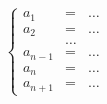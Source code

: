 \documentclass{article}
\begin{document}
\[
  \left\{
    \begin{array}{lcl}
      a_1&=&\ldots\\
      a_2&=&\ldots\\
      &\ldots\\
      a_{n-1}&=&\ldots\\
      a_n&=&\ldots\\
      a_{n+1}&=&\ldots 
    \end{array}
  \right.
\]
\end{document}
